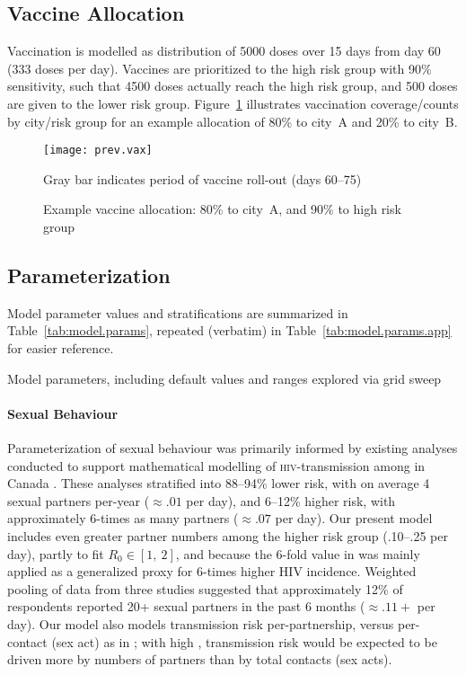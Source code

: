 \subsection{Vaccine Allocation}\label{app.model.vax}
Vaccination is modelled as distribution of 5000 doses over 15 days from day 60 (333 doses per day).
Vaccines are prioritized to the high risk group with 90\% sensitivity, such that
4500 doses actually reach the high risk group, and
500 doses are given to the lower risk group.
Figure~\ref{fig:prev.vax} illustrates vaccination coverage/counts by city/risk group
for an example allocation of 80\% to city~A and 20\% to city~B.
\begin{figure}[h]
  \texttt{[image: prev.vax]}
  \caption{Example vaccine allocation: 80\% to city~A, and 90\% to high risk group}
  \label{fig:prev.vax}
  \floatfoot
  Gray bar indicates period of vaccine roll-out (days 60--75)
\end{figure}
\subsection{Parameterization}\label{app.model.param}
Model parameter values and stratifications are summarized in Table~\ref{tab:model.params},
repeated (verbatim) in Table~\ref{tab:model.params.app} for easier reference.
\begin{table}
  \centering
  \caption{Model parameters, including default values and ranges explored via grid sweep}
  \label{tab:model.params.app}
  
\end{table}
\paragraph{Sexual Behaviour}
Parameterization of sexual behaviour was primarily informed by existing analyses conducted
to support mathematical modelling of \textsc{hiv}-transmission among \GBMSM in Canada
\cite[n.b. Appendix~3.2]{Wang2021}.
These analyses stratified \GBMSM into
88--94\% lower risk, with on average 4 sexual partners per-year ($\approx .01$ per day), and
6--12\% higher risk, with approximately 6-times as many partners ($\approx .07$ per day).
Our present model includes even greater partner numbers among the higher risk group (.10--.25 per day),
partly to fit \MPXV $R_0 \in [1,~2]$, and because
the 6-fold value in \cite{Wang2021} was mainly applied as a generalized proxy for
6-times higher HIV incidence.
Weighted pooling of data from three studies \cite{MaleCall2013,Lachowsky2016,Wilton2016}
suggested that approximately 12\% of respondents
reported 20+ sexual partners in the past 6 months ($\approx .11+$ per day).
Our \MPXV model also models transmission risk per-partnership,
versus per-contact (sex act) as in \cite{Wang2021};
with high \SAR, \MPXV transmission risk would be expected to be
driven more by numbers of partners than by total contacts (sex acts).
